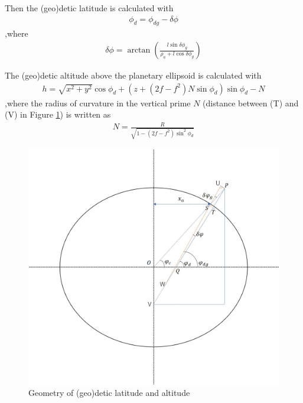 \documentclass[11pt]{article}
\begin{document}
\noindent Then the (geo)detic latitude is calculated with
\begin{equation}
	\label{eq:phi_d}
	\begin{aligned}
	\phi_d = \phi_{dg} - \delta\phi
	\end{aligned}
\end{equation}
,where
\begin{equation}
	\label{eq:delta_phi}
	\begin{aligned}
	\delta\phi = \arctan{\left(\frac{l\sin{\delta\phi_g}}{\rho_a+l\cos{\delta\phi_g}}\right)}
	\end{aligned}
\end{equation}

\noindent The (geo)detic altitude above the planetary ellipsoid is calculated with
\begin{equation}
	\label{eq:geo_alt}
	\begin{aligned}
	h =\sqrt{x^2+y^2}\cos{\phi_d} + \left(z + (2f-f^2)N\sin{\phi_d}\right)\sin{\phi_d} - N
	\end{aligned}
\end{equation}
,where the radius of curvature in the vertical prime $N$ (distance between (T) and (V) in Figure \ref{fig:1}) is written as
\begin{equation}
	\label{eq:N}
	\begin{aligned}
	N =\frac{R}{\sqrt{1-(2f-f^2)\sin^2{\phi_d}}}
	\end{aligned}
\end{equation}

\begin{figure}
  \includegraphics[width=\linewidth]{boundary_condition_for_entry_interface_fig1.jpg}
  \caption{Geometry of (geo)detic latitude and altitude}
  \label{fig:1}
\end{figure}
\end{document}
